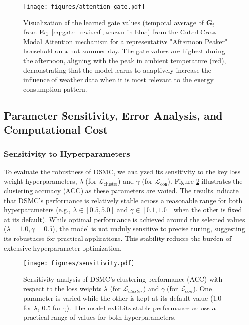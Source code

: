 \documentclass[journal]{IEEEtran}
\begin{document}
\begin{figure}[h!]
\centering
\texttt{[image: figures/attention\_gate.pdf]} %
\caption{Visualization of the learned gate values (temporal average of $\mathbf{G}_t$ from Eq. \ref{eq:gate_revised}, shown in blue) from the Gated Cross-Modal Attention mechanism for a representative "Afternoon Peaker" household on a hot summer day. The gate values are highest during the afternoon, aligning with the peak in ambient temperature (red), demonstrating that the model learns to adaptively increase the influence of weather data when it is most relevant to the energy consumption pattern.}
\label{fig:attention}
\end{figure}

\subsection{Parameter Sensitivity, Error Analysis, and Computational Cost}
\subsubsection{Sensitivity to Hyperparameters}
To evaluate the robustness of DSMC, we analyzed its sensitivity to the key loss weight hyperparameters, $\lambda$ (for $\mathcal{L}_{\text{cluster}}$) and $\gamma$ (for $\mathcal{L}_{\text{con}}$). Figure \ref{fig:sensitivity} illustrates the clustering accuracy (ACC) as these parameters are varied. The results indicate that DSMC's performance is relatively stable across a reasonable range for both hyperparameters (e.g., $\lambda \in [0.5, 5.0]$ and $\gamma \in [0.1, 1.0]$ when the other is fixed at its default). While optimal performance is achieved around the selected values ($\lambda=1.0, \gamma=0.5$), the model is not unduly sensitive to precise tuning, suggesting its robustness for practical applications. This stability reduces the burden of extensive hyperparameter optimization.

\begin{figure}[h!]
\centering
\texttt{[image: figures/sensitivity.pdf]} %
\caption{Sensitivity analysis of DSMC's clustering performance (ACC) with respect to the loss weights $\lambda$ (for $\mathcal{L}_{cluster}$) and $\gamma$ (for $\mathcal{L}_{con}$). One parameter is varied while the other is kept at its default value (1.0 for $\lambda$, 0.5 for $\gamma$). The model exhibits stable performance across a practical range of values for both hyperparameters.}
\label{fig:sensitivity}
\end{figure}
\end{document}
